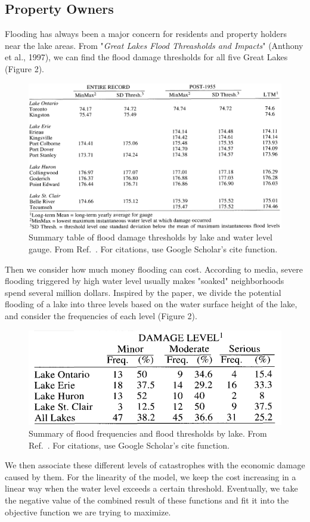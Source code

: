\documentclass[pre,12pt]{revtex4-1}
\begin{document}
\subsection{Property Owners}
Flooding has always been a major concern for residents and property holders near the lake areas. From "\textit{Great Lakes Flood Threasholds and Impacts}" (Anthony et al., 1997), we can find the flood damage thresholds for all five Great Lakes (Figure 2).  \par
\begin{figure}[htbp]
\begin{center}
\includegraphics[width=4.5in]{flood.png}
\caption{Summary table of flood damage thresholds by lake and water level gauge. From Ref.~\cite{nd97}. For citations, use Google Scholar's cite function.}
\label{leaf}
\end{center}
\end{figure}
Then we consider how much money flooding can cost. According to media, severe flooding triggered by high water level usually makes "soaked" neighborhoods spend several million dollars. Inspired by the paper, we divide the potential flooding of a lake into three levels based on the water surface height of the lake, and consider the frequencies of each level (Figure 2). 
\begin{figure}[htbp]
\begin{center}
\includegraphics[width=4.5in]{floodfreq.png}
\caption{Summary of flood frequencies and flood thresholds by lake. From Ref.~\cite{nd97}. For citations, use Google Scholar's cite function.}
\label{leaf}
\end{center}
\end{figure}
We then associate these different levels of catastrophes with the economic damage caused by them. For the linearity of the model, we keep the cost increasing in a linear way when the water level exceeds a certain threshold. Eventually, we take the negative value of the combined result of these functions and fit it into the objective function we are trying to maximize.
\end{document}
